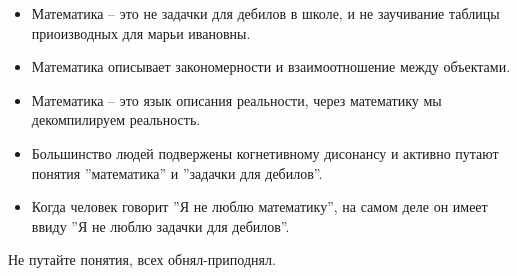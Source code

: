 \begin{itemize}
    \item Математика -- это не задачки для дебилов в школе, и не заучивание таблицы приоизводных для марьи ивановны.
    \item Математика описывает закономерности и взаимоотношение между объектами.
    \item Математика -- это язык описания реальности, через математику мы декомпилируем реальность.
    \item Большинство людей подвержены когнетивному дисонансу и активно путают понятия ''математика'' и ''задачки для дебилов''.
    \item Когда человек говорит ''Я не люблю математику'', на самом деле он имеет ввиду ''Я не люблю задачки для дебилов''.
\end{itemize}
Не путайте понятия, всех обнял-приподнял.